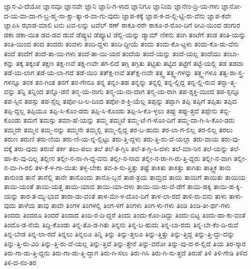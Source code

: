 {ಜ್ಞಾನ-ವಿ-ದೆಯೋ
ಜ್ಞಾನವೂ
ಜ್ಞಾನವೇ
ಜ್ಞಾನಿ
ಜ್ಞಾನಿ-ಗ-ಳಾದ
ಜ್ಞಾನಿಗೂ
ಜ್ಞಾನಿಯ
ಜ್ಞಾನೇಂ-ದ್ರಿ-ಯ-ಗಳು
ಜ್ಞಾನೋ-ದ-ಯ-ವಾ-ದಾ-ಗ-ಬ್ರ-ಹ್ಮ-ಸಾ-ಕ್ಷಾ-ತ್ಕಾ-ರ-ವಾ-ಗು-ವುದು
ಜ್ಞಾಪ-ಕಕ್ಕೆ
ಜ್ಞಾಪ-ಕ-ದ-ಲ್ಲಿ-ಟ್ಟಿ-ರು-ವೆನು
ಜ್ಞಾಪ-ಕವೇ
ಜ್ಞಾಪಿಸಿ
ಝಾಡ-ಮಾಲಿ
ಟನು
ಟವ-ಲನ್ನು
ಟವೆಲ್
ಠಣ್
ಠಾಕೂ-ರರೇ
ಠಾಕೂ-ರ-ರೊಂ-ದಿಗೆ
ಠೀವಿ-ಯಿಂದ
ಡಂಗುರ
ಡಕಾ
ಡಕಾ-ಯಿತ
ಡವ-ಡವ
ಡುವೆ
ಡೆಪ್ಯುಟಿ
ಡೆಪ್ಯೂಟಿ
ಡೆಲ್ಲಿ-ಯನ್ನು
ಡ್ಯಾಮ್
ಣಿಕನು
ತಂಗಿ
ತಂಟೆಗೆ
ತಂಡ
ತಂತಿ-ಯನ್ನು
ತಂತಿ-ಯಿಂದ
ತಂದ
ತಂದರು
ತಂದಳು
ತಂದಿ-ದ್ದಳು
ತಂದಿ-ದ್ದೀಯೆ
ತಂದು
ತಂದು-ಕೊ-ಟ್ಟಳು
ತಂದು-ಕೊ-ಡು-ವೆನು
ತಂದೆ
ತಂದೆಗೆ
ತಂದೆ-ತಾ-ಯಿ-ಗಳು
ತಂದೆ-ತಾ-ಯಿ-ಯರ
ತಂದೆಯ
ತಂದೆ-ಯನ್ನು
ತಂದೆ-ಯಲ್ಲ
ತಂದೆಯು
ತಂಬಾ-ಕನ್ನು
ತಕ್ಕ
ತಕ್ಕಂತೆ
ತಕ್ಷಣ
ತಕ್ಷ-ಣವೆ
ತಕ್ಷ-ಣವೇ
ತಗ-ಲಿದೆ
ತಗ್ಗಿ
ತಗ್ಗಿತು
ತಟ್ಟಿತು
ತಟ್ಟಿದ
ತಟ್ಟೆಗೆ
ತಟ್ಟೆ-ಯಲ್ಲಿ
ತಡ
ತಡವಾ
ತಡೆ-ಯ-ಲಾಗ
ತಡೆ-ಯ-ಲಾ-ಗದೆ
ತಡೆ-ಯಿರಿ
ತತ್ಕ್ಷ-ಣವೆ
ತತ್ಕ್ಷ-ಣವೇ
ತತ್ತ್ವ
ತತ್ತ್ವ-ಗಳನ್ನು
ತತ್ತ್ವ-ಗಳೂ
ತತ್ವ-ಶಾ-ಸ್ತ್ರ-ಗಳನ್ನೂ
ತನಕ
ತನ-ಗಿಂತ
ತನಗೆ
ತನ-ಗೇನೂ
ತನ್ನ
ತನ್ನಂ-ತಹ
ತನ್ನನ್ನು
ತನ್ನಲ್ಲಿ
ತನ್ನ-ಲ್ಲಿದ್ದ
ತನ್ನ-ಲ್ಲಿ-ರುವ
ತನ್ನಾ-ತ್ಮ-ವನ್ನು
ತನ್ನಿ
ತನ್ನಿಂದ
ತನ್ನೊ-ಡನೆ
ತನ್ಮ-ಯ-ನಾಗು
ತನ್ಮ-ಯ-ನಾ-ದಾಗ
ತನ್ಮ-ಯ-ರಾಗಿ
ತಪ-ಶ್ಶಕ್ತಿ-ಯಿಂದ
ತಪ-ಸ್ಸನ್ನೂ
ತಪ-ಸ್ಸಿನ
ತಪಸ್ಸು
ತಪ-ಸ್ಸೆಲ್ಲ
ತಪೋ-ಬ-ಲ-ದಿಂದ
ತಪೋ-ಶ-ಕ್ತಿ-ಯೆಲ್ಲ
ತಪ್ಪನ್ನು
ತಪ್ಪಾಗಿ
ತಪ್ಪಿ
ತಪ್ಪಿಗೆ
ತಪ್ಪಿತು
ತಪ್ಪಿದ
ತಪ್ಪಿ-ದ್ದಲ್ಲ
ತಪ್ಪಿಯೂ
ತಪ್ಪಿ-ಸಿ-ಕೊಂ-ಡರು
ತಪ್ಪಿ-ಸಿ-ಕೊಂಡು
ತಪ್ಪಿ-ಸಿ-ಕೊ-ಳ್ಳಲು
ತಪ್ಪು
ತಪ್ಪು-ತ್ತದೆ
ತಪ್ಪೇನು
ತಬ್ಬಿ-ಕೊಂಡು
ತಮಗೆ
ತಮಸ್ಸು
ತಮಾ-ಷೆ-ಯನ್ನು
ತಮ್ಮ
ತಮ್ಮಟೆ
ತಮ್ಮ-ಟೆ-ಗ-ಳೊಂ-ದಿಗೆ
ತಮ್ಮ-ದಾ-ಗಿ-ಸಿ-ಕೊಂ-ಡರು
ತಮ್ಮದೇ
ತಮ್ಮನ
ತಮ್ಮ-ನನ್ನು
ತಮ್ಮನೇ
ತಮ್ಮಲ್ಲಿ
ತಮ್ಮ-ಲ್ಲಿದ್ದ
ತರ-ಬ-ಹುದು
ತರ-ಲಾ-ಗ-ಲಿಲ್ಲ
ತರ-ಲಿಲ್ಲ
ತರಲು
ತರುಣ
ತರುಣಿ
ತರು-ಣಿಯ
ತರು-ಣಿ-ಯ-ನ್ನ-ಲ್ಲಿಟ್ಟು
ತರು-ತ್ತಿ-ದ್ದಳು
ತರು-ತ್ತಿ-ರು-ವೆ-ಯಲ್ಲಾ
ತರು-ವಾಯ
ತರು-ವು-ದಕ್ಕೆ
ತರು-ವುದು
ತರುವೆ
ತರ್ಕ
ತಲು-ಪಲು
ತಲೆ
ತಲೆ-ತ-ಗ್ಗಿಸಿ
ತಲೆ-ತ-ಗ್ಗಿ-ಸಿ-ದಳು
ತಲೆ-ಮಾ-ರಿನ
ತಲೆ-ಯನ್ನು
ತಲೆ-ಹಾ-ಕು-ವು-ದಿಲ್ಲ
ತಲ್ಲೀನ
ತಲ್ಲೀ-ನ-ನಾ-ಗಿ-ದ್ದ-ವನು
ತಲ್ಲೀ-ನ-ನಾದ
ತಲ್ಲೀ-ನ-ರಾ-ಗಿ-ರು-ತ್ತಿ-ದ್ದರು
ತಲ್ಲೀ-ನ-ವಾಗಿ
ತಲ್ಲೀ-ನ-ವಾ-ಗಿ-ರಲಿ
ತಳ-ಕೆ-ಳ-ಗಾ-ಯಿತು
ತಳ್ಳ-ಬೇಕು
ತವ-ಕಿ-ಸು-ತ್ತಿತ್ತು
ತಷ್ಟೆ
ತಾಕಿತು
ತಾಕಿತ್ತು
ತಾಗಿತು
ತಾತ್ತ್ವಿಕ
ತಾನು
ತಾನುಂಡ
ತಾನೆ
ತಾನೆಲ್ಲಿ
ತಾನೇ
ತಾನೊಂದು
ತಾನೊ-ಬ್ಬನೆ
ತಾಪ-ತ್ರಯ
ತಾಮ್ರದ
ತಾಯಿ
ತಾಯಿಗೆ
ತಾಯಿತು
ತಾಯಿಯ
ತಾಯಿ-ಯಂತೆ
ತಾಯಿ-ಯತ್ತ
ತಾಯಿ-ಯಾದ
ತಾಯಿ-ಯಾ-ದಳು
ತಾಯಿ-ಯಿ-ರು-ವೆ-ಡೆಗೆ
ತಾಯಿ-ಹಕ್ಕಿ
ತಾಯಿ-ಹ-ಕ್ಕಿ-ಯನ್ನು
ತಾರ-ತ-ಮ್ಯ-ಭಾವ
ತಾರಾ-ಡು-ವಂತೆ
ತಾಳ-ಮೇ-ಳ-ದೊಂ-ದಿಗೆ
ತಾಳ-ಲಾ-ರದೆ
ತಾಳಿ-ರು-ವನು
ತಾಳು
ತಾಳು-ವುದು
ತಾಳೆಯ
ತಾವು
ತಾವೇ
ತಿಂಗಳ
ತಿಂಗಳಲ್ಲಿ
ತಿಂಗ-ಳಿಗೆ
ತಿಂಗಳು
ತಿಂಗ-ಳು-ಗಳು
ತಿಂಡಿ
ತಿಂಡಿ-ತೀ-ರ್ಥ-ಗಳು
ತಿಂದರು
ತಿಂದರೂ
ತಿಂದರೆ
ತಿಂದಾದ
ತಿಂದಿ-ರ-ದಿ-ದ್ದರೆ
ತಿಂದು
ತಿಂದು-ಕೊಂ-ಡಿದ್ದು
ತಿಂದು-ಬಿಟ್ಟ
ತಿಂದು-ಹಾ-ಕು-ವಂತೆ
ತಿಂದೊ-ಡ-ನೆಯೆ
ತಿದ್ದಿ-ಕೊಂಡು
ತಿನ್ನ-ತೊ-ಡ-ಗಿತು
ತಿನ್ನನು
ತಿನ್ನ-ಬ-ಹುದು
ತಿನ್ನ-ಬಾ-ರದು
ತಿನ್ನ-ಬೇ-ಕೆಂ-ದಿ-ರುವೆ
ತಿನ್ನ-ಬೇಡ
ತಿನ್ನ-ಲಾ-ರದೆ
ತಿನ್ನಲು
ತಿನ್ನಲೂ
ತಿನ್ನಿ
ತಿನ್ನು
ತಿನ್ನು-ತ್ತಲೂ
ತಿನ್ನು-ತ್ತಿತ್ತು
ತಿನ್ನು-ತ್ತಿದ್ದ
ತಿನ್ನು-ತ್ತಿ-ದ್ದು-ದನ್ನು
ತಿನ್ನು-ತ್ತಿ-ರು-ವಿರಿ
ತಿನ್ನು-ತ್ತಿ-ರು-ವೆ-ಯಲ್ಲ
ತಿನ್ನು-ತ್ತಿವೆ
ತಿನ್ನು-ತ್ತೇನೆ
ತಿನ್ನು-ವರೋ
ತಿನ್ನು-ವು-ದ-ರ-ಲ್ಲಿದೆ
ತಿಯ
ತಿರ-ಸ್ಕಾರ
ತಿರು-ಗಾ-ಡು-ತ್ತಿ-ದ್ದನು
ತಿರು-ಗಾ-ಡು-ತ್ತಿ-ದ್ದಾಗ
ತಿರು-ಗಿ-ಸಲು
ತಿರು-ಗಿಸಿ
ತಿರು-ಗಿ-ಸು-ತ್ತದೆ
ತಿರುಪೆ
ತಿಳಿ
ತಿಳಿ-ಗೇಡಿ
ತಿಳಿದ
ತಿಳಿ-ದ-ನಂ-ತರ
}

